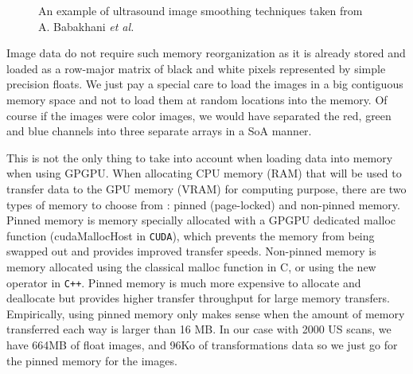 \documentclass[12pt,journal,compsoc]{IEEEtran}
\begin{document}
\begin{figure}[!ht]
\centering
{}
\hfil
{}
\caption{An example of ultrasound image smoothing techniques taken from A. Babakhani \textit{et al.}\cite{1}}
\label{comparisson_smoothing}
\end{figure}

Image data do not require such memory reorganization as it is already stored and loaded as a row-major matrix of black and white pixels represented by simple precision floats. We just pay a special care to load the images in a big contiguous memory space and not to load them at random locations into the memory.
Of course if the images were color images, we would have separated the red, green and blue channels into three separate arrays in a SoA manner. \par

This is not the only thing to take into account when loading data into memory when using GPGPU.
When allocating CPU memory (RAM) that will be used to transfer data to the GPU memory (VRAM) for computing purpose, there are two types of memory to choose from : pinned (page-locked) and non-pinned memory. 
Pinned memory is memory specially allocated with a GPGPU dedicated malloc function (cudaMallocHost in \texttt{CUDA}), which prevents the memory from being swapped out and provides improved transfer speeds. 
Non-pinned memory is memory allocated using the classical malloc function in C, or using the new operator in \texttt{C++}. 
Pinned memory is much more expensive to allocate and deallocate but provides higher transfer throughput for large memory transfers.
Empirically, using pinned memory only makes sense when the amount of memory transferred each way is larger than 16 MB. 
In our case with 2000 US scans, we have 664MB of float images, and 96Ko of transformations data so we just go for the pinned memory for the images. \par
\end{document}
